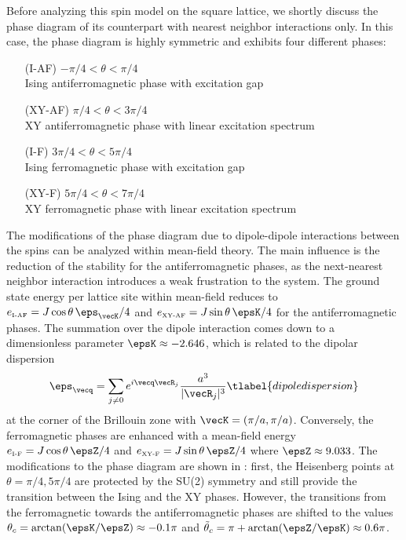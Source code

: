 Before analyzing this spin model on the square lattice, we
shortly discuss the phase diagram
of its counterpart with nearest neighbor interactions only.
In this case, the phase diagram is highly symmetric and
exhibits four different phases:
\begin{enumerate}[labelindent=2.55em,leftmargin=!]
    \item[(I-AF)] $-\pi/4 < \theta < \pi/4$\\Ising antiferromagnetic phase with excitation gap
    \item[(XY-AF)] $\pi/4 < \theta < 3\pi/4$\\XY antiferromagnetic phase with linear excitation spectrum
    \item[(I-F)] $3 \pi/4 < \theta < 5\pi/4$\\Ising ferromagnetic phase with excitation gap
    \item[(XY-F)] $5 \pi/4 < \theta < 7\pi/4$\\XY ferromagnetic phase with linear excitation spectrum
\end{enumerate}
The modifications of the phase diagram due to dipole-dipole
interactions between the spins can be analyzed within mean-field theory. The
main influence is the reduction of the stability for the antiferromagnetic
phases, as the next-nearest neighbor interaction introduces a weak frustration
to the system. The ground state energy per lattice site within mean-field
reduces to $ e_{\mbox{\tiny I-AF}} = J \cos \theta \, \eps_\vecK/4$ and $e_{\mbox{\tiny XY-AF}} = J \sin \theta \, \epsK/4$
for the antiferromagnetic phases. The summation over the dipole interaction
comes down to a dimensionless parameter $\epsK \approx -2.646$, which is related to
the dipolar dispersion~\cite{Muller2010,Peter2012b,Syzranov2014,Peter2014}
%
\begin{align}
    \eps_\vecq = \sum_{j \neq 0} e^{i \vecq \vecR_j }\frac{a^3}{|\vecR_j|^3}
  \tlabel{dipoledispersion}
\end{align}
%
at the corner of the Brillouin zone with $\vecK = (\pi/a, \pi /a)$.
Conversely, the ferromagnetic phases are enhanced with a mean-field energy
$e_{\mbox{\tiny I-F}} = J \cos \theta \, \epsZ/4 $ and $ e_{\mbox{\tiny XY-F}} = J \sin \theta \, \epsZ/4$
where $\epsZ \approx 9.033$. The modifications to the
phase diagram are shown in : first, the Heisenberg points at
$\theta = \pi/4, 5 \pi/4$ are protected by the SU(2) symmetry and still
provide the transition between the Ising and the XY phases. However, the
transitions from the ferromagnetic towards the antiferromagnetic phases are
shifted to the values $\theta_{c}= \arctan(\epsK/\epsZ)
\approx -0.1 \pi$ and $\tilde{\theta}_c = \pi+ \arctan(\epsZ/\epsK)\approx 0.6 \pi$.


